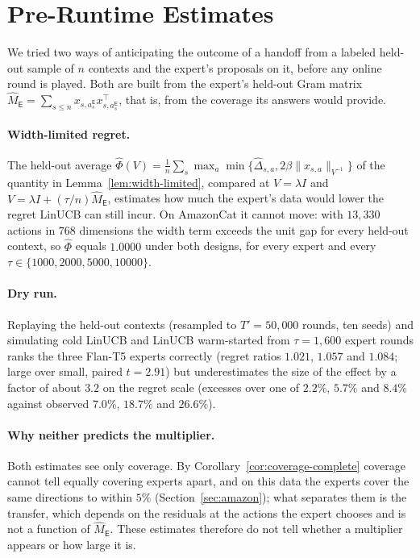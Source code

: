 \documentclass{article}
\theoremstyle{definition}
\theoremstyle{remark}
\theoremstyle{remark}
\newcommand{\Exp}{\mathsf{E}}
\begin{document}
\section{Pre-Runtime Estimates}
\label{app:diagnostics}

We tried two ways of anticipating the outcome of a handoff from a labeled
held-out sample of $n$ contexts and the expert's proposals on it, before any
online round is played. Both are built from the expert's held-out Gram matrix
$\widehat M_{\Exp}=\sum_{s\le n}x_{s,a_s^{\Exp}}x_{s,a_s^{\Exp}}^\top$, that is,
from the coverage its answers would provide.

\paragraph{Width-limited regret.} The held-out average
$\widehat\Phi(V)=\frac1n\sum_s\max_a\min\{\widehat\Delta_{s,a},2\beta\|x_{s,a}\|_{V^{-1}}\}$
of the quantity in Lemma~\ref{lem:width-limited}, compared at
$V=\lambda I$ and $V=\lambda I+(\tau/n)\widehat M_{\Exp}$, estimates how much
the expert's data would lower the regret LinUCB can still incur. On AmazonCat
it cannot move: with $13{,}330$ actions in $768$ dimensions the width term
exceeds the unit gap for every held-out context, so $\widehat\Phi$ equals
$1.0000$ under both designs, for every expert and every
$\tau\in\{1000,2000,5000,10000\}$.

\paragraph{Dry run.} Replaying the held-out contexts (resampled to
$T'=50{,}000$ rounds, ten seeds) and simulating cold LinUCB and LinUCB
warm-started from $\tau=1{,}600$ expert rounds ranks the three Flan-T5 experts
correctly (regret ratios $1.021$, $1.057$ and $1.084$; large over small,
paired $t=2.91$) but underestimates the size of the effect by a factor of
about $3.2$ on the regret scale (excesses over one of $2.2\%$, $5.7\%$ and
$8.4\%$ against observed $7.0\%$, $18.7\%$ and $26.6\%$).

\paragraph{Why neither predicts the multiplier.} Both estimates see only
coverage. By Corollary~\ref{cor:coverage-complete} coverage cannot tell
equally covering experts apart, and on this data the experts cover the same
directions to within $5\%$ (Section~\ref{sec:amazon}); what separates them is
the transfer, which depends on the residuals at the actions the expert
chooses and is not a function of $\widehat M_{\Exp}$. These estimates
therefore do not tell whether a multiplier appears or how large it is.
\end{document}
